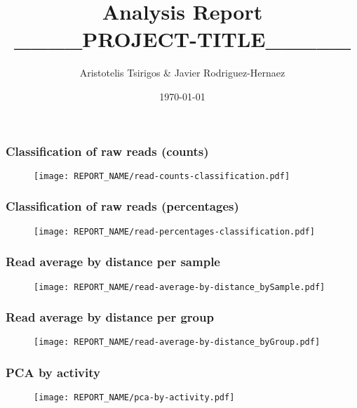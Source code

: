 \documentclass{beamer}
\title[Report]{Analysis Report \\ ____PROJECT-TITLE_____}
\author{
\newline Aristotelis Tsirigos & 
\newline Javier Rodriguez-Hernaez
} %
\institute[NYU] %
{NYU School of Medicine\\ %
\medskip
\textit{
\newline Aristotelis.Tsirigos@nyulangone.org
\newline Javier.RodriguezHernaez@nyulangone.org
} %
}
\date{\today} %
\begin{document}
\begin{frame}
\titlepage %
\end{frame}




\begin{frame}
\frametitle{Classification of raw reads (counts)}
\begin{figure}
\texttt{[image: REPORT\_NAME/read-counts-classification.pdf]}
\end{figure}
\end{frame}


\begin{frame}
\frametitle{Classification of raw reads (percentages)}
\begin{figure}
\texttt{[image: REPORT\_NAME/read-percentages-classification.pdf]}
\end{figure}
\end{frame}


\begin{frame}
\frametitle{Read average by distance per sample}
\begin{figure}
\texttt{[image: REPORT\_NAME/read-average-by-distance\_bySample.pdf]}
\end{figure}
\end{frame}


\begin{frame}
\frametitle{Read average by distance per group}
\begin{figure}
\texttt{[image: REPORT\_NAME/read-average-by-distance\_byGroup.pdf]}
\end{figure}
\end{frame}


\begin{frame}
\frametitle{PCA by activity}
\begin{figure}
\texttt{[image: REPORT\_NAME/pca-by-activity.pdf]}
\end{figure}
\end{frame}
\end{document}
